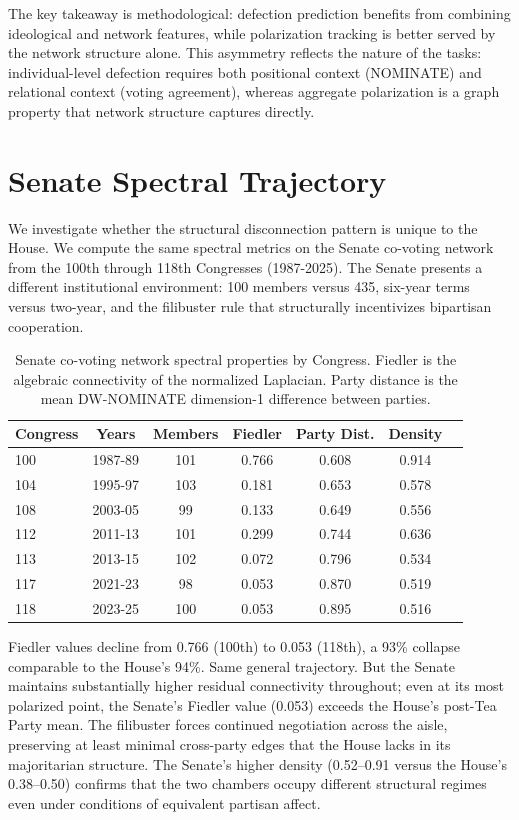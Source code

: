 \documentclass[12pt, a4paper]{article}
\begin{document}
The key takeaway is methodological: defection prediction benefits from combining ideological and network features, while polarization tracking is better served by the network structure alone. This asymmetry reflects the nature of the tasks: individual-level defection requires both positional context (NOMINATE) and relational context (voting agreement), whereas aggregate polarization is a graph property that network structure captures directly.

\FloatBarrier
\section{Senate Spectral Trajectory}
\label{app:senate}

We investigate whether the structural disconnection pattern is unique to the House. We compute the same spectral metrics on the Senate co-voting network from the 100th through 118th Congresses (1987-2025). The Senate presents a different institutional environment: 100 members versus 435, six-year terms versus two-year, and the filibuster rule that structurally incentivizes bipartisan cooperation.

\begin{table}[!htbp]
\centering
{\small
\caption{Senate co-voting network spectral properties by Congress. Fiedler is the algebraic connectivity of the normalized Laplacian. Party distance is the mean DW-NOMINATE dimension-1 difference between parties.}
\label{tab:senate_spectral}
\begin{tabular}{lcccccc}
\toprule
Congress & Years & Members & Fiedler & Party Dist. & Density \\
\midrule
100 & 1987-89 & 101 & 0.766 & 0.608 & 0.914 \\
104 & 1995-97 & 103 & 0.181 & 0.653 & 0.578 \\
108 & 2003-05 & 99 & 0.133 & 0.649 & 0.556 \\
112 & 2011-13 & 101 & 0.299 & 0.744 & 0.636 \\
113 & 2013-15 & 102 & 0.072 & 0.796 & 0.534 \\
117 & 2021-23 & 98 & 0.053 & 0.870 & 0.519 \\
118 & 2023-25 & 100 & 0.053 & 0.895 & 0.516 \\
\bottomrule
\end{tabular}
}
\end{table}

Fiedler values decline from 0.766 (100th) to 0.053 (118th), a 93\% collapse comparable to the House's 94\%. Same general trajectory. But the Senate maintains substantially higher residual connectivity throughout; even at its most polarized point, the Senate's Fiedler value (0.053) exceeds the House's post-Tea Party mean. The filibuster forces continued negotiation across the aisle, preserving at least minimal cross-party edges that the House lacks in its majoritarian structure. The Senate's higher density (0.52--0.91 versus the House's 0.38--0.50) confirms that the two chambers occupy different structural regimes even under conditions of equivalent partisan affect.
\end{document}
